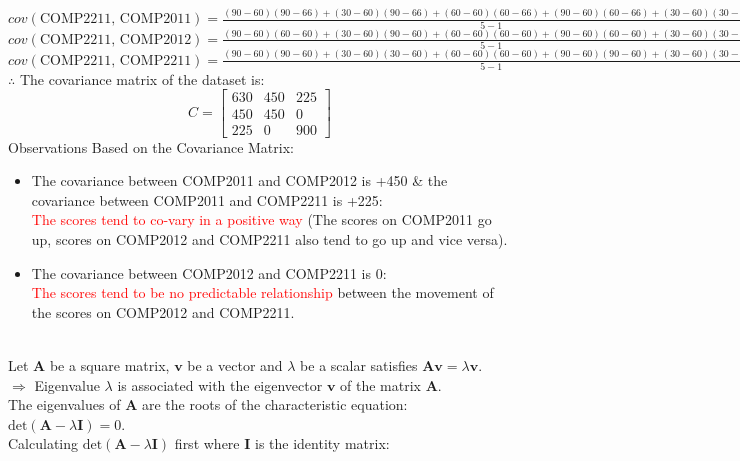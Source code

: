 \documentclass{book}
\begin{document}
\( cov(\text{COMP2211, COMP2011}) = \frac{(90-60)(90-66) + (30-60)(90-66) + (60-60)(60-66) + (90-60)(60-66) + (30-60)(30-66)}{5-1} = 225 \)\\
\( cov(\text{COMP2211, COMP2012}) = \frac{(90-60)(60-60) + (30-60)(90-60) + (60-60)(60-60) + (90-60)(60-60) + (30-60)(30-60)}{5-1} = 0 \)\\
\( cov(\text{COMP2211, COMP2211}) = \frac{(90-60)(90-60) + (30-60)(30-60) + (60-60)(60-60) + (90-60)(90-60) + (30-60)(30-60)}{5-1} = 900 \)\\
\vspace{2mm}
$\therefore$ The covariance matrix of the dataset is:
\[
    C = \begin{bmatrix}
        630 & 450 & 225\\
        450 & 450 & 0\\
        225 & 0 & 900
    \end{bmatrix}
\]
Observations Based on the Covariance Matrix:
\begin{itemize}
    \item The covariance between COMP2011 and COMP2012 is +450 \& the covariance between COMP2011 and COMP2211 is +225:\\
    \textcolor{red}{The scores tend to co-vary in a positive way} (The scores on COMP2011 go up, scores on COMP2012 and COMP2211 also tend to go up and vice versa).
    \item The covariance between COMP2012 and COMP2211 is 0:\\
    \textcolor{red}{The scores tend to be no predictable relationship} between the movement of the scores on COMP2012 and COMP2211.
\end{itemize}
\newpage
{}\\
Let \(\mathbf{A}\) be a square matrix, \(\mathbf{v}\) be a vector and \(\lambda\) be a scalar satisfies \(\mathbf{Av}= \lambda \mathbf{v}\).\\
\(\Rightarrow\) Eigenvalue \(\lambda\) is associated with the eigenvector \(\mathbf{v}\) of the matrix \(\mathbf{A}\).\\
The eigenvalues of \(\mathbf{A}\) are the roots of the characteristic equation: \(\text{det}(\mathbf{A} - \lambda \mathbf{I}) = 0\).\\
\vspace{2mm}
Calculating \(\text{det}(\mathbf{A} - \lambda \mathbf{I})\) first where \(\mathbf{I}\) is the identity matrix:
\end{document}

